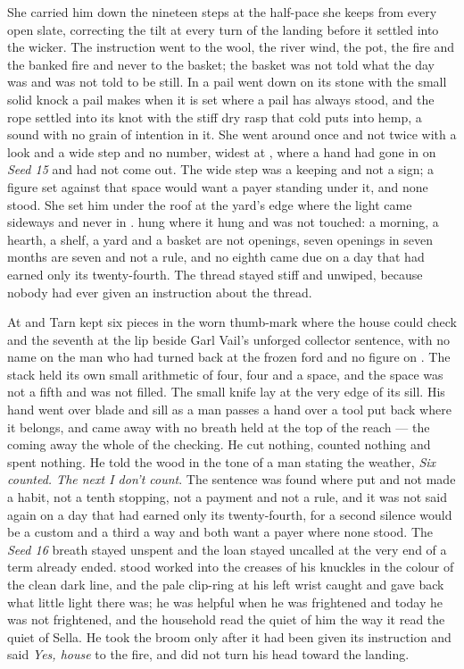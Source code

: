 She carried him down the nineteen steps at the half-pace she keeps from every open slate, correcting the tilt at every turn of the landing before it settled into the wicker. The instruction went to the wool, the river wind, the pot, the fire and the banked fire and never to the basket; the basket was not told what the day was and was not told to be still. In  a pail went down on its stone with the small solid knock a pail makes when it is set where a pail has always stood, and the rope settled into its knot with the stiff dry rasp that cold puts into hemp, a sound with no grain of intention in it. She went around  once and not twice with a look and a wide step and no number, widest at , where a hand had gone in on \emph{Seed 15} and had not come out. The wide step was a keeping and not a sign; a figure set against that space would want a payer standing under it, and none stood. She set him under the roof at the yard's edge where the light came sideways and never in .  hung where it hung and was not touched: a morning, a hearth, a shelf, a yard and a basket are not openings, seven openings in seven months are seven and not a rule, and no eighth came due on a day that had earned only its twenty-fourth. The thread stayed stiff and unwiped, because nobody had ever given an instruction about the thread.

\scenebreak

At  and  Tarn kept six pieces in the worn thumb-mark where the house could check and the seventh at the lip beside Garl Vail's unforged collector sentence, with no name on the man who had turned back at the frozen ford and no figure on . The stack held its own small arithmetic of four, four and a space, and the space was not a fifth and was not filled. The small knife lay at the very edge of its sill. His hand went over blade and sill as a man passes a hand over a tool put back where it belongs, and came away with no breath held at the top of the reach --- the coming away the whole of the checking. He cut nothing, counted nothing and spent nothing. He told the wood in the tone of a man stating the weather, \emph{Six counted. The next I don't count}. The sentence was found where put and not made a habit, not a tenth stopping, not a payment and not a rule, and it was not said again on a day that had earned only its twenty-fourth, for a second silence would be a custom and a third a way and both want a payer where none stood. The \emph{Seed 16} breath stayed unspent and the loan stayed uncalled at the very end of a term already ended.  stood worked into the creases of his knuckles in the colour of the clean dark line, and the pale clip-ring at his left wrist caught and gave back what little light there was; he was helpful when he was frightened and today he was not frightened, and the household read the quiet of him the way it read the quiet of Sella. He took the broom only after it had been given its instruction and said \emph{Yes, house} to the fire, and did not turn his head toward the landing.


